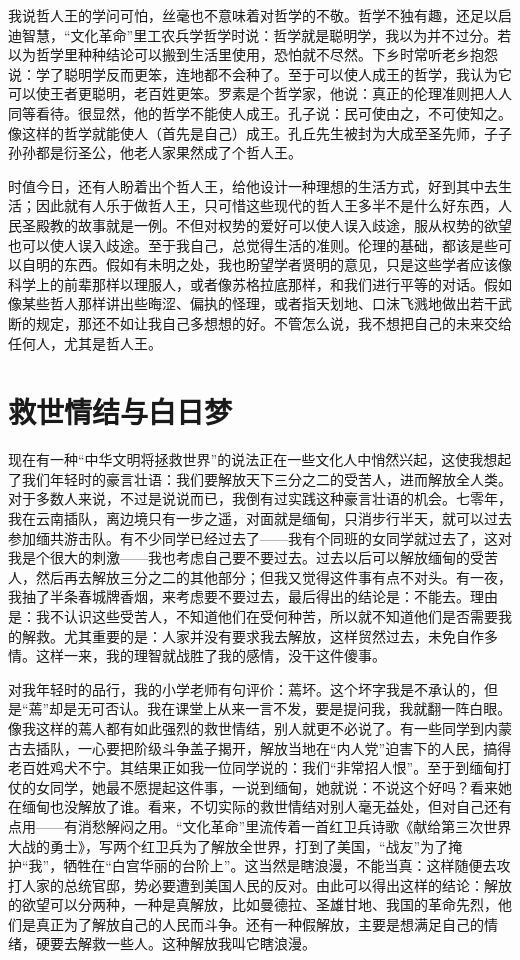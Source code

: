 我说哲人王的学问可怕，丝毫也不意味着对哲学的不敬。哲学不独有趣，还足以启迪智慧，“文化革命”里工农兵学哲学时说：哲学就是聪明学，我以为并不过分。若以为哲学里种种结论可以搬到生活里使用，恐怕就不尽然。下乡时常听老乡抱怨说：学了聪明学反而更笨，连地都不会种了。至于可以使人成王的哲学，我认为它可以使王者更聪明，老百姓更笨。罗素是个哲学家，他说：真正的伦理准则把人人同等看待。很显然，他的哲学不能使人成王。孔子说：民可使由之，不可使知之。像这样的哲学就能使人（首先是自己）成王。孔丘先生被封为大成至圣先师，子子孙孙都是衍圣公，他老人家果然成了个哲人王。 

时值今日，还有人盼着出个哲人王，给他设计一种理想的生活方式，好到其中去生活；因此就有人乐于做哲人王，只可惜这些现代的哲人王多半不是什么好东西，人民圣殿教的故事就是一例。不但对权势的爱好可以使人误入歧途，服从权势的欲望也可以使人误入歧途。至于我自己，总觉得生活的准则。伦理的基础，都该是些可以自明的东西。假如有未明之处，我也盼望学者贤明的意见，只是这些学者应该像科学上的前辈那样以理服人，或者像苏格拉底那样，和我们进行平等的对话。假如像某些哲人那样讲出些晦涩、偏执的怪理，或者指天划地、口沫飞溅地做出若干武断的规定，那还不如让我自己多想想的好。不管怎么说，我不想把自己的未来交给任何人，尤其是哲人王。

\chapter{救世情结与白日梦}

现在有一种“中华文明将拯救世界”的说法正在一些文化人中悄然兴起，这使我想起了我们年轻时的豪言壮语：我们要解放天下三分之二的受苦人，进而解放全人类。对于多数人来说，不过是说说而已，我倒有过实践这种豪言壮语的机会。七零年，我在云南插队，离边境只有一步之遥，对面就是缅甸，只消步行半天，就可以过去参加缅共游击队。有不少同学已经过去了——我有个同班的女同学就过去了，这对我是个很大的刺激——我也考虑自己要不要过去。过去以后可以解放缅甸的受苦人，然后再去解放三分之二的其他部分；但我又觉得这件事有点不对头。有一夜，我抽了半条春城牌香烟，来考虑要不要过去，最后得出的结论是：不能去。理由是：我不认识这些受苦人，不知道他们在受何种苦，所以就不知道他们是否需要我的解救。尤其重要的是：人家并没有要求我去解放，这样贸然过去，未免自作多情。这样一来，我的理智就战胜了我的感情，没干这件傻事。 

对我年轻时的品行，我的小学老师有句评价：蔫坏。这个坏字我是不承认的，但是“蔫”却是无可否认。我在课堂上从来一言不发，要是提问我，我就翻一阵白眼。像我这样的蔫人都有如此强烈的救世情结，别人就更不必说了。有一些同学到内蒙古去插队，一心要把阶级斗争盖子揭开，解放当地在“内人党”迫害下的人民，搞得老百姓鸡犬不宁。其结果正如我一位同学说的：我们“非常招人恨”。至于到缅甸打仗的女同学，她最不愿提起这件事，一说到缅甸，她就说：不说这个好吗？看来她在缅甸也没解放了谁。看来，不切实际的救世情结对别人毫无益处，但对自己还有点用——有消愁解闷之用。“文化革命”里流传着一首红卫兵诗歌《献给第三次世界大战的勇士》，写两个红卫兵为了解放全世界，打到了美国，“战友”为了掩护“我”，牺牲在“白宫华丽的台阶上”。这当然是瞎浪漫，不能当真：这样随便去攻打人家的总统官邸，势必要遭到美国人民的反对。由此可以得出这样的结论：解放的欲望可以分两种，一种是真解放，比如曼德拉、圣雄甘地、我国的革命先烈，他们是真正为了解放自己的人民而斗争。还有一种假解放，主要是想满足自己的情绪，硬要去解救一些人。这种解放我叫它瞎浪漫。 

